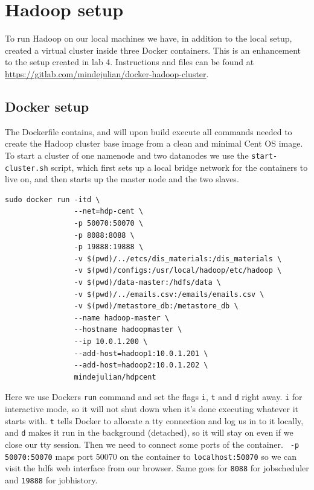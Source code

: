 \documentclass[runningheads,a4paper]{llncs}
\begin{document}
\section{Hadoop setup}
\label{sec:hadoop}
To run Hadoop on our local machines we have, in addition to the local setup, created a virtual cluster inside three Docker containers. This is an enhancement to the setup created in lab 4. Instructions and files can be found at \url{https://gitlab.com/mindejulian/docker-hadoop-cluster}.
\subsection{Docker setup}
\label{sec:docker}
The Dockerfile contains, and will upon build execute all commands needed to create the Hadoop cluster base image from a clean and minimal Cent OS image. To start a cluster of one namenode and two datanodes we use the \verb!start-cluster.sh! script, which first sets up a local bridge network for the containers to live on, and then starts up the master node and the two slaves.
\begin{verbatim}
sudo docker run -itd \
                --net=hdp-cent \
                -p 50070:50070 \
                -p 8088:8088 \
                -p 19888:19888 \
                -v $(pwd)/../etcs/dis_materials:/dis_materials \
                -v $(pwd)/configs:/usr/local/hadoop/etc/hadoop \
                -v $(pwd)/data-master:/hdfs/data \
                -v $(pwd)/../emails.csv:/emails/emails.csv \
                -v $(pwd)/metastore_db:/metastore_db \
                --name hadoop-master \
                --hostname hadoopmaster \
                --ip 10.0.1.200 \
                --add-host=hadoop1:10.0.1.201 \
                --add-host=hadoop2:10.0.1.202 \
                mindejulian/hdpcent
\end{verbatim}
Here we use Dockers \verb!run! command and set the flags \verb!i!, \verb!t! and \verb!d! right away. \verb!i! for interactive mode, so it will not shut down when it's done executing whatever it starts with. \verb!t! tells Docker to allocate a tty connection and log us in to it locally, and \verb!d! makes it run in the background (detached), so it will stay on even if we close our tty session. Then we need to connect some ports of the container. \verb! -p 50070:50070! maps port 50070 on the container to \verb!localhost:50070! so we can visit the hdfs web interface from our browser. Same goes for \verb!8088! for jobscheduler and \verb!19888! for jobhistory.
\newline
\end{document}
